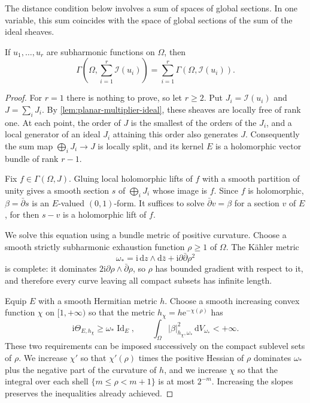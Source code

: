 The distance condition below involves a sum of spaces of global sections. In one variable, this sum coincides with the space of global sections of the sum of the ideal sheaves.

\begin{lemma}\label{lem:planar-global-ideal-sum}
If $u_1,\ldots,u_r$ are subharmonic functions on $\Omega$, then
\begin{equation}\label{eq:planar-global-ideal-sum}
 \Gamma\left(\Omega,\sum_{i=1}^r\mathcal I(u_i)\right)
       =\sum_{i=1}^r\Gamma(\Omega,\mathcal I(u_i)).
\end{equation}
\end{lemma}
\begin{proof}
For $r=1$ there is nothing to prove, so let $r\geq2$. Put $J_i=\mathcal I(u_i)$ and $J=\sum_iJ_i$. By \cref{lem:planar-multiplier-ideal}, these sheaves are locally free of rank one. At each point, the order of $J$ is the smallest of the orders of the $J_i$, and a local generator of an ideal $J_i$ attaining this order also generates $J$. Consequently the sum map $\bigoplus_iJ_i\to J$ is locally split, and its kernel $E$ is a holomorphic vector bundle of rank $r-1$.

Fix $f\in\Gamma(\Omega,J)$. Gluing local holomorphic lifts of $f$ with a smooth partition of unity gives a smooth section $s$ of $\bigoplus_iJ_i$ whose image is $f$. Since $f$ is holomorphic, $\beta=\bar\partial s$ is an $E$-valued $(0,1)$-form. It suffices to solve $\bar\partial v=\beta$ for a section $v$ of $E$, for then $s-v$ is a holomorphic lift of $f$.

We solve this equation using a bundle metric of positive curvature. Choose a smooth strictly subharmonic exhaustion function $\rho\geq1$ of $\Omega$. The K\"ahler metric
\[
 \omega_*=\mathrm i\,\mathrm{d}z\wedge\mathrm{d}\bar z
                   +\mathrm i\partial\bar\partial\rho^2
\]
is complete: it dominates $2\mathrm i\partial\rho\wedge\bar\partial\rho$, so $\rho$ has bounded gradient with respect to it, and therefore every curve leaving all compact subsets has infinite length.

Equip $E$ with a smooth Hermitian metric $h$. Choose a smooth increasing convex function $\chi$ on $[1,+\infty)$ so that the metric $h_\chi=h\mathrm e^{-\chi(\rho)}$ has
\[
 \mathrm i\Theta_{E,h_\chi}\geq\omega_*\operatorname{Id}_E,
 \qquad \int_\Omega |\beta|_{h_\chi,\omega_*}^2\,\mathrm{d}V_{\omega_*}<+\infty.
\]
These two requirements can be imposed successively on the compact sublevel sets of $\rho$. We increase $\chi'$ so that $\chi'(\rho)$ times the positive Hessian of $\rho$ dominates $\omega_*$ plus the negative part of the curvature of $h$, and we increase $\chi$ so that the integral over each shell $\{m\leq\rho<m+1\}$ is at most $2^{-m}$. Increasing the slopes preserves the inequalities already achieved.


\end{proof}
